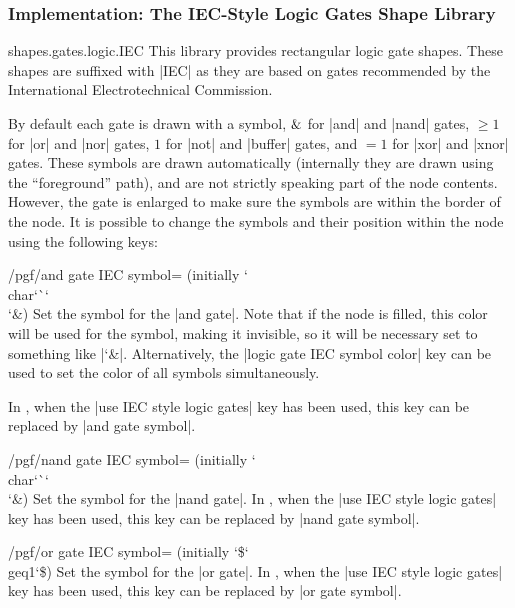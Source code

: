\subsubsection{Implementation: The IEC-Style Logic Gates Shape Library}

\begin{pgflibrary}{shapes.gates.logic.IEC}
    This library provides rectangular logic gate shapes. These shapes are
    suffixed with |IEC| as they are based on gates recommended by the
    International Electrotechnical Commission.

    By default each gate is drawn with a symbol, $\char`\&$ for |and| and
    |nand| gates, $\geq1$ for |or| and |nor| gates, $1$ for |not| and |buffer|
    gates, and $=1$ for |xor| and |xnor| gates. These symbols are drawn
    automatically (internally they are drawn using the ``foreground'' path),
    and are not strictly speaking part of the node contents. However, the gate
    is enlarged to make sure the symbols are within the border of the node. It
    is possible to change the symbols and their position within the node using
    the following keys:

    \begin{key}{/pgf/and gate IEC symbol= (initially \char`\\char\char`\`\char`\\\char`\&)}
        Set the symbol for the |and gate|. Note that if the node is filled,
        this color will be used for the symbol, making it invisible, so it will
        be necessary set  to something like |\color{black}\char`\&|.
        Alternatively, the |logic gate IEC symbol color| key can be used to set
        the color of all symbols simultaneously.

        In \tikzname, when the |use IEC style logic gates| key has been used,
        this key can be replaced by |and gate symbol|.
    \end{key}

    \begin{key}{/pgf/nand gate IEC symbol= (initially \char`\\char\char`\`\char`\\\char`\&)}
        Set the symbol for the |nand gate|. In \tikzname, when the
        |use IEC style logic gates| key has been used, this key can be replaced
        by |nand gate symbol|.
    \end{key}

    \begin{key}{/pgf/or gate IEC symbol= (initially \char`\$\char`\\geq1\char`\$)}
        Set the symbol for the |or gate|. In \tikzname, when the
        |use IEC style logic gates| key has been used, this key can be replaced
        by |or gate symbol|.
    \end{key}


\end{pgflibrary}
